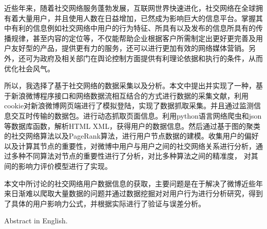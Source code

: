\begin{cabstract}
近些年来，随着社交网络服务蓬勃发展，互联网世界快速进化，社交网络在全球拥有着大量用户，并且使用人数在日益增加，已然成为影响巨大的信息平台。掌握其中有利的信息例如社交网络中用户的行为特征、所具有以及发布的信息所具有的传播规律，甚至内容的定位等，不仅能帮助企业根据客户所需制定出更好更完善及用户友好型的产品，提供更有力的服务，还可以进行更加有效的网络媒体营销。另外，还可为政府及相关部门在舆论控制方面提供有利理论依据和执行的条件，从而优化社会风气。
\par
所以，我选择了基于社交网络的数据采集以及分析。本文中提出并实现了一种，基于新浪微博程序接口和网络数据流相互结合的方式进行数据的采集文献，利用cookie对新浪微博网页端进行了模拟登陆，实现了数据抓取采集。并且通过监测信息交互时传输的数据包。进行动态抓取页面信息。利用python语言网络爬虫和json等数据库函数，解析HTML XML，获得用户的数据信息。然后通过基于图的聚类的社交网络算法以及PageRank算法，进行用户节点数据的建模。收集用户的偏好以及计算其节点的重要性，对微博中用户与用户之间的社交网络关系进行分析，通过多种不同算法对节点的重要性进行了分析，对比多种算法之间的精准度， 对其间的影响力评价模型进行了实现。
\par
本文中所讨论的社交网络用户数据信息的获取，主要问题是在于解决了微博近些年来日渐难以爬取大量数据的问题并通过数据挖掘对对用户行为进行分析研究，得到了具体的用户影响力公式，并根据实际进行了验证与误差分析。

\end{cabstract}


\begin{eabstract}
Abstract in English.
\end{eabstract}

